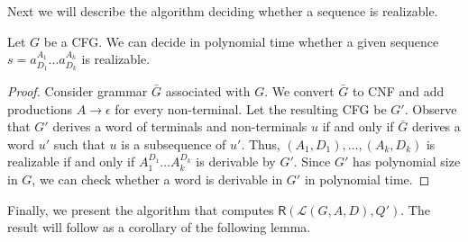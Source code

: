\documentclass{CSML}
\newcommand{\lang}{\mathcal{L}}
\newcommand{\R}{\textsf{R}}
\begin{document}
Next we will describe the algorithm deciding whether a sequence is realizable.


\begin{lem}
Let $G$ be a CFG.  
We can decide in polynomial time whether
a given sequence $s=a_{D_1}^{A_1}\ldots a_{D_k}^{A_k}$ is realizable.
\label{l:realizability-polynomial}
\end{lem}
\begin{proof}
Consider grammar $\bar{G}$ associated with $G$. 
We convert $\bar{G}$ to CNF and add productions $A \rightarrow \epsilon$ for every non-terminal. 
Let the resulting CFG be $G'$.
Observe that $G'$ derives a word of terminals and non-terminals $u$ if and only if 
$\bar{G}$ derives a word $u'$ such that $u$ is a subsequence of $u'$. 
Thus, $(A_1,D_1), \ldots, (A_k, D_k)$ is realizable if and only if 
$A_1^{D_1} \ldots A_k^{D_k}$ is derivable by $G'$. 
Since $G'$ has polynomial size in $G$, we can check whether a word is derivable in $G'$ in polynomial time.
\end{proof}

Finally, we present the algorithm that computes $\R(\lang(G,A,D),Q')$. 
The result will follow as a corollary of the following lemma.
\end{document}
